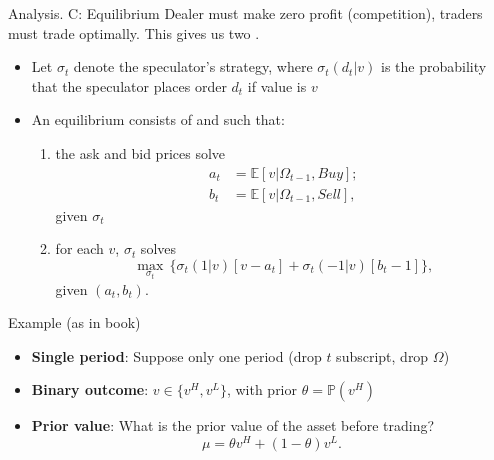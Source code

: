 \documentclass[english,10pt]{beamer}
\begin{document}
\begin{frame}{Analysis. C: Equilibrium}
	Dealer must make zero profit ({competition}), traders must trade optimally.
	This gives us two .
	\begin{itemize}
		\item Let $\sigma_t$ denote the speculator's strategy, where $\sigma_t(d_t|v)$ is the probability that the speculator places order $d_t$ if value is $v$
		\item \alert{An equilibrium} consists of  and  such that:
		\begin{enumerate}
			\item the ask and bid prices  solve 
			\begin{align*}
			a_t & = \mathbb{E}[v| \Omega_{t-1}, Buy]; \\
			b_t & = \mathbb{E}[v| \Omega_{t-1}, Sell],
			\end{align*}
			given $\sigma_t$
			\item for each $v$, $\sigma_t$ solves 
			\[
			\max_{\sigma_t } \, \{\sigma_t(1|v) [v-a_t] + \sigma_t(-1|v)[b_t-1] \},
			\]
			given $(a_t,b_t)$.
		\end{enumerate} 
	\end{itemize}
\end{frame}




\begin{frame}{Example (as in book)}
\begin{itemize}
	\item \textbf{Single period}: Suppose only one period (drop $t$ subscript, drop $\Omega$)
	\item \textbf{Binary outcome}: $v \in \{ v^H, v^L\}$, with prior $\theta=\mathbb{P}(v^H) $ 
	\item \textbf{Prior value}: What is the prior value of the asset before trading?
	\[
	\mu=\theta v^H+(1-\theta) v^L.
	\]
\end{itemize}
\end{frame}
\end{document}
